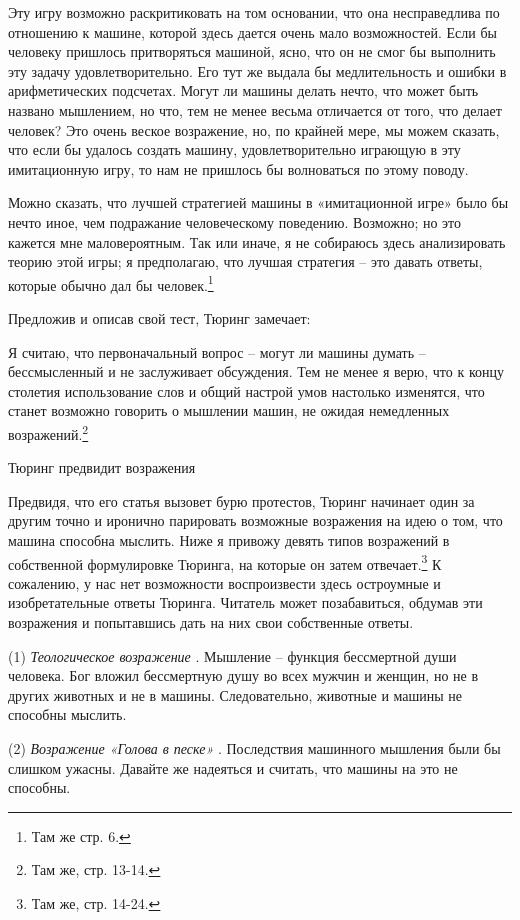 \documentclass[../main.tex]{subfiles}
\begin{document}
Эту игру возможно раскритиковать на том основании, что она несправедлива по отношению к машине, которой здесь дается очень мало возможностей. Если бы человеку пришлось притворяться машиной, ясно, что он не смог бы выполнить эту задачу удовлетворительно. Его тут же выдала бы медлительность и ошибки в арифметических подсчетах. Могут ли машины делать нечто, что может быть названо мышлением, но что, тем не менее весьма отличается от того, что делает человек? Это очень веское возражение, но, по крайней мере, мы можем сказать, что если бы удалось создать машину, удовлетворительно играющую в эту имитационную игру, то нам не пришлось бы волноваться по этому поводу.

Можно сказать, что лучшей стратегией машины в «имитационной игре» было бы нечто иное, чем подражание человеческому поведению. Возможно; но это кажется мне маловероятным. Так или иначе, я не собираюсь здесь анализировать теорию этой игры; я предполагаю, что лучшая стратегия \--- это давать ответы, которые обычно дал бы человек.\footnote{Там же стр. 6.}

Предложив и описав свой тест, Тюринг замечает:

Я считаю, что первоначальный вопрос \--- могут ли машины думать \--- бессмысленный и не заслуживает обсуждения. Тем не менее я верю, что к концу столетия использование слов и общий настрой умов настолько изменятся, что станет возможно говорить о мышлении машин, не ожидая немедленных возражений.\footnote{Там же, стр. 13-14.}

Тюринг предвидит возражения

Предвидя, что его статья вызовет бурю протестов, Тюринг начинает один за другим точно и иронично парировать возможные возражения на идею о том, что машина способна мыслить. Ниже я привожу девять типов возражений в собственной формулировке Тюринга, на которые он затем отвечает.\footnote{Там же, стр. 14-24.} К сожалению, у нас нет возможности воспроизвести здесь остроумные и изобретательные ответы Тюринга. Читатель может позабавиться, обдумав эти возражения и попытавшись дать на них свои собственные ответы.

(1) \emph{Теологическое возражение} . Мышление \--- функция бессмертной души человека. Бог вложил бессмертную душу во всех мужчин и женщин, но не в других животных и не в машины. Следовательно, животные и машины не способны мыслить.

(2) \emph{Возражение «Голова в песке»} . Последствия машинного мышления были бы слишком ужасны. Давайте же надеяться и считать, что машины на это не способны.
\end{document}
